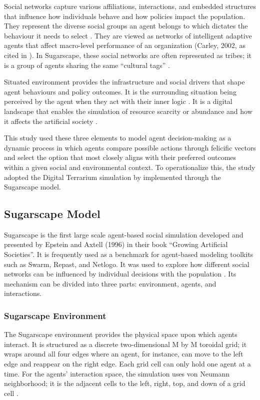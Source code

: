 \documentclass{icsthesis}
\begin{document}
\begin{mainmatter}
Social networks capture various affiliations, interactions, and embedded structures that influence how individuals behave and how policies impact the population. They represent the diverse social groups an agent belongs to which dictates the behaviour it needs to select \citep{Tolk2022}. They are viewed as networks of intelligent adaptive agents that affect macro-level performance of an organization (Carley, 2002, as cited in \citealp{Lempert2002}). In Sugarscape, these social networks are often represented as tribes; it is a group of agents sharing the same “cultural tags” \citep{KremerHerman2024b}.

Situated environment provides the infrastructure and social drivers that shape agent behaviours and policy outcomes. It is the surrounding situation being perceived by the agent when they act with their inner logic \citep{Tolk2022}. It is a digital landscape that enables the simulation of resource scarcity or abundance and how it affects the artificial society \citep{KremerHerman2024b}.  

This study used these three elements to model agent decision-making as a dynamic process in which agents compare possible actions through felicific vectors and select the option that most closely aligns with their preferred outcomes within a given social and environmental context. To operationalize this, the study adopted the Digital Terrarium simulation by \citet{KremerHerman2024b} implemented through the Sugarscape model.

			\subsection{Sugarscape Model}
Sugarscape is the first large scale agent-based social simulation developed and presented by Epstein and Axtell (1996) in their book “Growing Artificial Societies”. It is frequently used as a benchmark for agent-based modeling toolkits such as Swarm, Repast, and Netlogo. It was used to explore how different social networks can be influenced by individual decisions with the population \citep{Kehoe2015}. Its mechanism can be divided into three parts: environment, agents, and interactions.

				\subsubsection{Sugarscape Environment}
The Sugarscape environment provides the physical space upon which agents interact. It is structured as a discrete two-dimensional M by M toroidal grid; it wraps around all four edges where an agent, for instance, can move to the left edge and reappear on the right edge. Each grid cell can only hold one agent at a time. For the agents’ interaction space, the simulation uses von Neumann neighborhood; it is the adjacent cells to the left, right, top, and down of a grid cell \citep{Kehoe2015}. 


\end{mainmatter}
\end{document}

